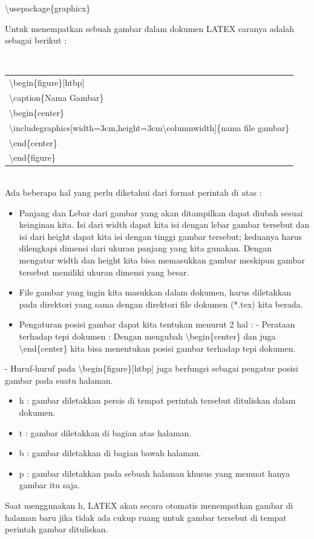 \textbackslash usepackage\{graphicx\}\\[0.5 cm]

\begin{raggedleft}Untuk menempatkan sebuah gambar dalam dokumen LATEX caranya adalah sebagai berikut :\end{raggedleft}\\[0.5 cm]
\begin{tabular}{|p{13.5 cm}|}
\hline
\textbackslash begin\{figure\}[htbp]\\
\textbackslash caption\{Nama Gambar\}\\
    \textbackslash begin\{center\}\\
\textbackslash includegraphics[width=3cm,height=3cm\textbackslash columnwidth]\{nama file gambar\}\\
    \textbackslash end\{center\}\\
\textbackslash end\{figure\}\\
    \hline
\end{tabular}\\[0.5 cm]
Ada beberapa hal yang perlu diketahui dari format perintah di atas :
\begin{itemize}
\item Panjang dan Lebar dari gambar yang akan ditampilkan dapat diubah sesuai keinginan
kita. Isi dari width dapat kita isi dengan lebar gambar tersebut dan isi dari height dapat
kita isi dengan tinggi gambar tersebut; keduanya harus dilengkapi dimensi dari ukuran
panjang yang kita gunakan. Dengan mengatur width dan height kita bisa memasukkan
gambar meskipun gambar tersebut memiliki ukuran dimensi yang besar.
\item File gambar yang ingin kita masukkan dalam dokumen, harus diletakkan pada direktori
yang sama dengan direktori file dokumen (*.tex) kita berada.
\item Pengaturan posisi gambar dapat kita tentukan menurut 2 hal :
-	Perataan terhadap tepi dokumen : Dengan mengubah \textbackslash begin\{center\} dan juga \textbackslash end\{center\} kita bisa menentukan posisi gambar terhadap tepi dokumen.
\end{itemize}
\noindent - Huruf-huruf pada \textbackslash begin\{figure\}[htbp] juga berfungsi sebagai pengatur posisi gambar pada suatu halaman.
\begin{itemize}
\item  h : gambar diletakkan persis di tempat perintah tersebut dituliskan dalam dokumen.
\item	t : gambar diletakkan di bagian atas halaman.
\item	b : gambar diletakkan di bagian bawah halaman.
\item	p : gambar diletakkan pada sebuah halaman khusus yang memuat hanya gambar itu saja.
\end{itemize}
Saat menggunakan h, LATEX akan secara otomatis menempatkan gambar di halaman baru jika tidak ada cukup ruang untuk gambar tersebut di tempat perintah gambar dituliskan.
